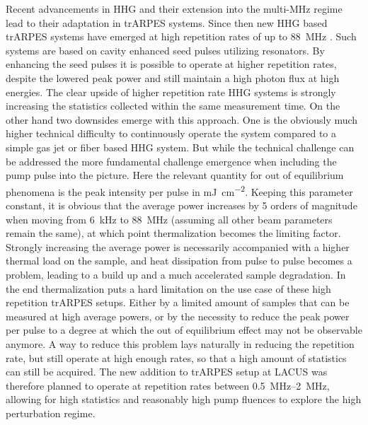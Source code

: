 Recent advancements in HHG and their extension into the multi-\unit{\mega\hertz} regime \cite{mills_xuv_2012,hadrich_high_2014,pronin_high-power_2015,saraceno_toward_2015,hadrich_single-pass_2016,carstens_high-harmonic_2016,zhao_efficient_2018} lead to their adaptation in trARPES systems.
Since then new HHG based trARPES systems have emerged at high repetition rates of up to \qty{88}{\mega\hertz} \cite{corder_ultrafast_2018,mills_cavity-enhanced_2019}.
Such systems are based on cavity enhanced seed pulses utilizing resonators.
By enhancing the seed pulses it is possible to operate at higher repetition rates, despite the lowered peak power and still maintain a high photon flux at high energies.
The clear upside of higher repetition rate HHG systems is strongly increasing the statistics collected within the same measurement time.
On the other hand two downsides emerge with this approach.
One is the obviously much higher technical difficulty to continuously operate the system compared to a simple gas jet or fiber based HHG system.
But while the technical challenge can be addressed the more fundamental challenge emergence when including the pump pulse into the picture.
Here the relevant quantity for out of equilibrium phenomena is the peak intensity per pulse in \unit{\milli\joule\per\centi\meter^2}.
Keeping this parameter constant, it is obvious that the average power increases by 5 orders of magnitude when moving from \qty{6}{\kilo\hertz} to \qty{88}{\mega\hertz} (assuming all other beam parameters remain the same), at which point thermalization becomes the limiting factor.
Strongly increasing the average power is necessarily accompanied with a higher thermal load on the sample, and heat dissipation from pulse to pulse becomes a problem, leading to a build up and a much accelerated sample degradation.
In the end thermalization puts a hard limitation on the use case of these high repetition trARPES setups.
Either by a limited amount of samples that can be measured at high average powers, or by the necessity to reduce the peak power per pulse to a degree at which the out of equilibrium effect may not be observable anymore.
A way to reduce this problem lays naturally in reducing the repetition rate, but still operate at high enough rates, so that a high amount of statistics can still be acquired.
The new addition to trARPES setup at LACUS was therefore planned to operate at repetition rates between \qtyrange{0.5}{2}{\mega\hertz}, allowing for high statistics and reasonably high pump fluences to explore the high perturbation regime.

